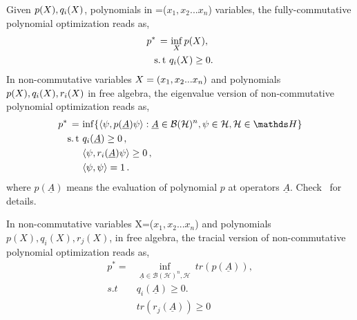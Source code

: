 Given $p(X),q_i(X)$, polynomials in \xx =($x_1,x_2...x_n$) variables, the fully-commutative polynomial optimization reads as,
\begin{align}
       p^* \, = & \, \inf_{X} p(X), \\
    \operatorname{s.t} \, & \, q_i(X) \geq 0. 
\end{align}
In non-commutative variables $ X=(x_1,x_2...x_n) $ and polynomials $p(X),q_i(X), r_i(X)$ in free algebra, the eigenvalue version of non-commutative polynomial optimization reads as,
\begin{align}
  \label{eq:ncpop}
       p^* \, = \, & \inf \{ \braket{\psi,p(\underline{A}) \psi} :  \underline{A} \in \mathcal{B}(\mathcal{H})^n, \psi \in \mathcal{H}, \mathcal{H} \in \mathds H \} \\
    \operatorname{s.t} \, & \, q_i(\underline{A}) \geq 0\, , \\
   & \braket{\psi ,r_i(\underline{A}) \psi} \geq 0 \, , \\
   & \braket{\psi , \psi} = 1 \, .
\end{align}
where $p(\underline{A})$ means the evaluation of polynomial $p$ at operators $\underline{A}$. Check~\cite{doi:10.1137/090760155} for details.

In non-commutative variables X=($x_1,x_2...x_n$) and polynomials $p(X),q_i(X), r_j(X)$, in free algebra, the tracial version of non-commutative polynomial optimization reads as,
\begin{equation}
\begin{split}
       p^* =& \underset{\underline{A} \in \mathcal{B}(\mathcal{H})^n, \mathcal{H}}{\inf} \: tr(p(\underline{A})), \\
    s.t \: & q_i(\underline{A}) \geq 0. \\
     & tr(r_j(\underline{A})) \geq 0
\end{split}
\end{equation}


